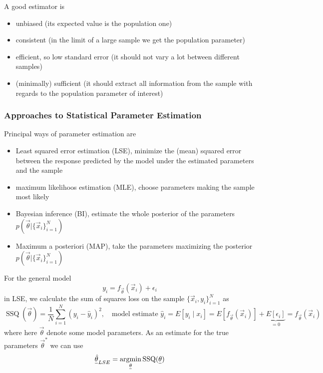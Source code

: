 A good estimator is
\begin{itemize}
    \item unbiased (its expected value is the population one)
    \item consistent (in the limit of a large sample we get the population parameter)
    \item efficient, so low standard error (it should not vary a lot between different samples)
    \item (minimally) sufficient (it should extract all information from the sample with regards to the population parameter of interest)
\end{itemize}

\subsubsection{Approaches to Statistical Parameter Estimation}

Principal ways of parameter estimation are
\begin{itemize}
    \item Least squared error estimation (LSE), minimize the (mean) squared error between the response predicted by the model under the estimated parameters and the sample
    \item maximum likelihoos estimation (MLE), choose parameters making the sample most likely
    \item Bayesian inference (BI), estimate the whole posterior of the parameters $p(\vec{\theta}|\{\vec{x}_i\}_{i=1}^N)$
    \item Maximum a posteriori (MAP), take the parameters maximizing the posterior $p(\vec{\theta}|\{\vec{x}_i\}_{i=1}^N)$
\end{itemize}

For the general model
\begin{equation}
    y_i = f_\vec{\theta}(\vec{x}_i) + \epsilon_i
\end{equation}
in LSE, we calculate the sum of squares loss on the sample $\{ \vec{x}_i,y_i \}_{i=1}^N$ as
\begin{equation}
    \operatorname{SSQ}(\vec{\theta}) = \frac{1}{N} \sum_{i=1}^{N} (y_i - \hat{y}_i)^2, \quad \text{model estimate } \hat{y}_i = E\left[y_i \mid x_i\right]=E\left[f_{\vec{\theta}}\left(\vec{x}_i\right)\right]+\underbrace{E\left[\epsilon_i\right]}_{=0}=f_{\vec{\theta}}\left(\vec{x}_i\right)
\end{equation}
where here $\vec{\theta}$ denote some model parameters. As an estimate for the true parameters $\vec{\theta}^*$ we can use
\begin{equation}
    \vec{\hat{\theta}}_{LSE} = \argmin_{\vec{\theta}} \operatorname{SSQ}(\vec{\theta})
\end{equation}

